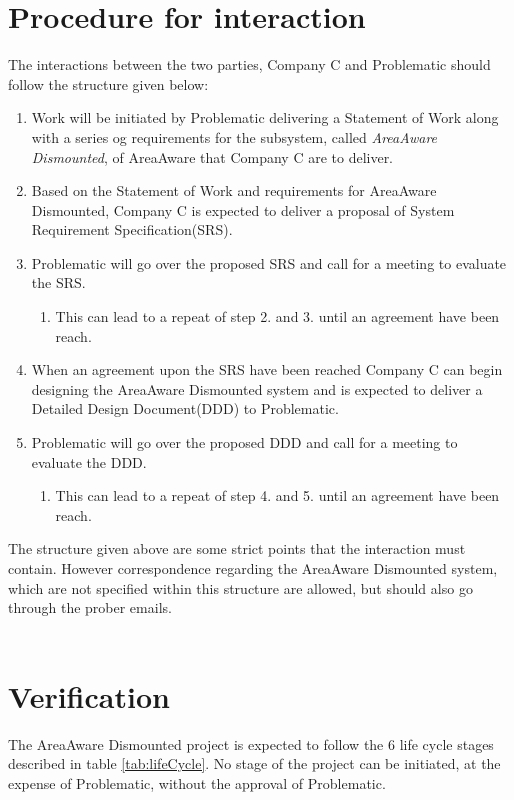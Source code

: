 \chapter{Procedure for interaction}
The interactions between the two parties, Company C and Problematic should follow the structure given below:
\begin{enumerate}
    \item Work will be initiated by Problematic delivering a Statement of Work along with a series og requirements for the subsystem, called \emph{AreaAware Dismounted}, of AreaAware that Company C are to deliver.
    \item Based on the Statement of Work and requirements for AreaAware Dismounted, Company C is expected to deliver a proposal of System Requirement Specification(SRS).
    \item Problematic will go over the proposed SRS and call for a meeting to evaluate the SRS.
    \begin{enumerate}
        \item This can lead to a repeat of step 2. and 3. until an agreement have been reach.
    \end{enumerate}
    \item When an agreement upon the SRS have been reached Company C can begin designing the AreaAware Dismounted system and is expected to deliver a Detailed Design Document(DDD) to Problematic.
    \item Problematic will go over the proposed DDD and call for a meeting to evaluate the DDD.
    \begin{enumerate}
        \item This can lead to a repeat of step 4. and 5. until an agreement have been reach.
    \end{enumerate}
\end{enumerate}
The structure given above are some strict points that the interaction must contain.
However correspondence regarding the AreaAware Dismounted system, which are not specified within this structure are allowed, but should also go through the prober emails.\\\\


\chapter{Verification}
The AreaAware Dismounted project is expected to follow the 6 life cycle stages described in table \ref{tab:lifeCycle}.
No stage of the project can be initiated, at the expense of Problematic, without the approval of Problematic.


